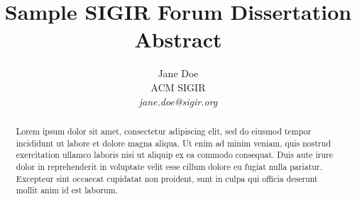 \documentclass[dissertation]{sigirforum}
\begin{document}
\title{Sample SIGIR Forum Dissertation Abstract}

\author{
Jane Doe\\ACM SIGIR\\\emph{jane.doe@sigir.org}
}

\maketitle 
\begin{abstract}
Lorem ipsum dolor sit amet, consectetur adipiscing elit, sed do eiusmod tempor incididunt ut labore et dolore magna aliqua. Ut enim ad minim veniam, quis nostrud exercitation ullamco laboris nisi ut aliquip ex ea commodo consequat. Duis aute irure dolor in reprehenderit in voluptate velit esse cillum dolore eu fugiat nulla pariatur. Excepteur sint occaecat cupidatat non proident, sunt in culpa qui officia deserunt mollit anim id est laborum.
\end{abstract}

\nocite{forum}


\end{document}
